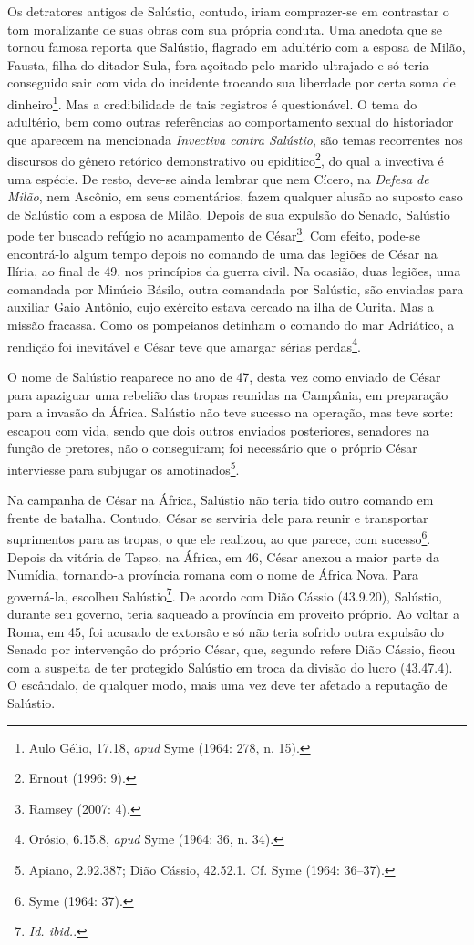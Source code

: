 Os detratores antigos de Salústio, contudo, iriam comprazer-se em contrastar o
tom moralizante de suas obras com sua própria conduta. Uma anedota que se
tornou famosa reporta que Salústio, flagrado em adultério com a esposa de
Milão, Fausta, filha do ditador Sula, fora açoitado pelo marido ultrajado e só
teria conseguido sair com vida do incidente trocando sua liberdade por certa
soma de dinheiro\footnote{ Aulo Gélio,  17.18, \emph{apud} Syme (1964: 
278, n. 15).}.  Mas a credibilidade de tais registros é questionável. O tema do
adultério, bem como outras referências ao comportamento sexual do historiador
que aparecem na mencionada \emph{Invectiva contra Salústio}, são temas
recorrentes nos discursos do gênero retórico demonstrativo ou
epidítico\footnote{Ernout (1996: 9).}, do qual a invectiva é uma espécie. De resto, deve-se ainda lembrar que nem
Cícero, na \emph{Defesa de Milão}, nem Ascônio, em seus comentários, fazem
qualquer alusão ao suposto caso de Salústio com a esposa de Milão.  Depois de
sua expulsão do Senado, Salústio pode ter buscado refúgio no acampamento de
César\footnote{Ramsey (2007: 4).}. Com efeito, pode-se encontrá-lo algum
tempo depois no comando de uma das legiões de César na Ilíria, ao final de 49,
nos princípios da guerra civil. Na ocasião, duas legiões, uma comandada por
Minúcio Básilo, outra comandada por Salústio, são enviadas para auxiliar Gaio
Antônio, cujo exército estava cercado na ilha de Curita. Mas a missão fracassa.
Como os pompeianos detinham o comando do mar Adriático, a rendição foi
inevitável e César teve que amargar sérias perdas\footnote{Orósio, 6.15.8,
\emph{apud} Syme (1964: 36, n. 34).}.

O nome de Salústio reaparece no ano de 47, desta vez como enviado de César para
apaziguar uma rebelião das tropas reunidas na Campânia, em preparação para a
invasão da África. Salústio não teve sucesso na operação, mas teve sorte:
escapou com vida, sendo que dois outros enviados posteriores, senadores na função de pretores, não o conseguiram; foi necessário que o próprio César
interviesse para subjugar os amotinados\footnote{Apiano, \emph{} 2.92.387; Dião Cássio, 42.52.1. Cf. Syme (1964: 36--37).}. 

Na campanha de César na África, Salústio não teria tido outro comando em frente
de batalha. Contudo, César se serviria dele para reunir e transportar
suprimentos para as tropas, o que ele realizou, ao que parece, com
sucesso\footnote{Syme (1964: 37).}. Depois da vitória de Tapso, na África,
em 46, César anexou a maior parte da Numídia, tornando-a província romana com o
nome de África Nova. Para governá-la, escolheu Salústio\footnote{\emph{ Id.
ibid.}.}. De acordo com Dião Cássio (43.9.20),  Salústio, durante seu
governo, teria saqueado a província em proveito próprio. Ao voltar a Roma, em
45, foi acusado de extorsão e só não teria sofrido outra expulsão do Senado por
intervenção do próprio César, que, segundo refere Dião Cássio, ficou com a
suspeita de ter protegido Salústio em troca da divisão do lucro (43.47.4). O
escândalo, de qualquer modo, mais uma vez deve ter afetado a reputação de
Salústio.


